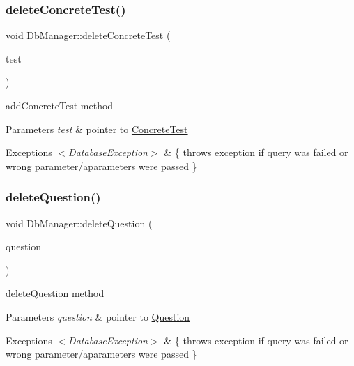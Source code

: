\subsubsection{\texorpdfstring{delete\+Concrete\+Test()}{deleteConcreteTest()}}
{\footnotesize\ttfamily void Db\+Manager\+::delete\+Concrete\+Test (\begin{DoxyParamCaption}\item[{std\+::shared\+\_\+ptr$<$ \hyperlink{class_concrete_test}{Concrete\+Test} $>$}]{test }\end{DoxyParamCaption})}



add\+Concrete\+Test method 


\begin{DoxyParams}{Parameters}
{\em test} & pointer to \hyperlink{class_concrete_test}{Concrete\+Test} \\
\hline
\end{DoxyParams}

\begin{DoxyExceptions}{Exceptions}
{\em $<$\+Database\+Exception$>$} & \{ throws exception if query was failed or wrong parameter/aparameters were passed \} \\
\hline
\end{DoxyExceptions}
\mbox{\label{class_db_manager_afd1ef019f752995c4b06f00c29b4ebdc}} 
\subsubsection{\texorpdfstring{delete\+Question()}{deleteQuestion()}}
{\footnotesize\ttfamily void Db\+Manager\+::delete\+Question (\begin{DoxyParamCaption}\item[{std\+::shared\+\_\+ptr$<$ \hyperlink{class_question}{Question} $>$}]{question }\end{DoxyParamCaption})}



delete\+Question method 


\begin{DoxyParams}{Parameters}
{\em question} & pointer to \hyperlink{class_question}{Question} \\
\hline
\end{DoxyParams}

\begin{DoxyExceptions}{Exceptions}
{\em $<$\+Database\+Exception$>$} & \{ throws exception if query was failed or wrong parameter/aparameters were passed \} \\
\hline
\end{DoxyExceptions}
\mbox{\label{class_db_manager_aad9f028c4b4754b1ac8fc133b0030b8e}} 
